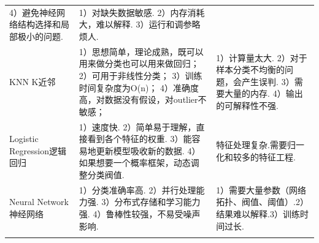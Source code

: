 \begin{longtable}[]{lll}
\begin{minipage}[t]{0.04\columnwidth}
  4）避免神经网络结构选择和局部极小的问题.
  \strut
\end{minipage}
&
\begin{minipage}[t]{0.04\columnwidth}
  \raggedright
  \strut
  1）对缺失数据敏感.
  2）内存消耗大，难以解释.
  3）运行和调参略烦人.
  \strut
\end{minipage}
\tabularnewline
\begin{minipage}[t]{0.04\columnwidth}\raggedright\strut
KNN K近邻\strut
\end{minipage} & \begin{minipage}[t]{0.04\columnwidth}\raggedright\strut
1）思想简单，理论成熟，既可以用来做分类也可以用来做回归；
2）可用于非线性分类；
3）训练时间复杂度为O(n)；
4）准确度高，对数据没有假设，对outlier不敏感；
\strut
\end{minipage} & \begin{minipage}[t]{0.04\columnwidth}
  \raggedright
  \strut
  1）计算量太大.
  2）对于样本分类不均衡的问题，会产生误判.
  3）需要大量的内存.
  4）输出的可解释性不强.
  \strut
\end{minipage}
\tabularnewline
\begin{minipage}[t]{0.04\columnwidth}\raggedright\strut
Logistic Regression逻辑回归\strut
\end{minipage}
&
\begin{minipage}[t]{0.04\columnwidth}\raggedright\strut
  1）速度快.
  2）简单易于理解，直接看到各个特征的权重.
  3）能容易地更新模型吸收新的数据.
  4）如果想要一个概率框架，动态调整分类阀值.
  \strut
\end{minipage} &
\begin{minipage}[t]{0.04\columnwidth}\raggedright\strut
特征处理复杂.需要归一化和较多的特征工程.\strut
\end{minipage}\tabularnewline
\begin{minipage}[t]{0.04\columnwidth}\raggedright\strut
Neural Network 神经网络\strut
\end{minipage} & \begin{minipage}[t]{0.04\columnwidth}\raggedright\strut
  1）分类准确率高.
  2）并行处理能力强.
  3）分布式存储和学习能力强.
  4）鲁棒性较强，不易受噪声影响.\strut
\end{minipage} & \begin{minipage}[t]{0.04\columnwidth}\raggedright\strut
1）需要大量参数（网络拓扑、阀值、阈值）.2）结果难以解释.3）训练时间过长.\strut
\end{minipage}\tabularnewline
\begin{minipage}[t]{0.04\columnwidth}\raggedright\strut

\end{minipage}
\end{longtable}
